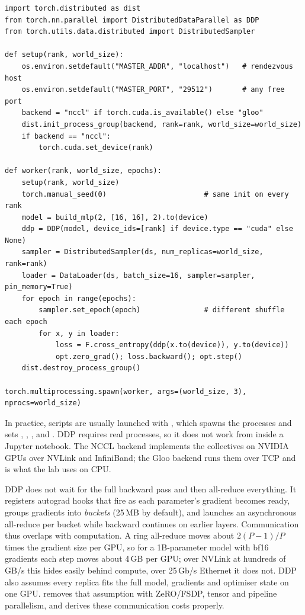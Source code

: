 \begin{lstlisting}[caption={The essential pieces of DDP training (excerpt of \texttt{ddp\_demo.py}).},label={lst:pytorch:ddpcode}]
import torch.distributed as dist
from torch.nn.parallel import DistributedDataParallel as DDP
from torch.utils.data.distributed import DistributedSampler

def setup(rank, world_size):
    os.environ.setdefault("MASTER_ADDR", "localhost")   # rendezvous host
    os.environ.setdefault("MASTER_PORT", "29512")       # any free port
    backend = "nccl" if torch.cuda.is_available() else "gloo"
    dist.init_process_group(backend, rank=rank, world_size=world_size)
    if backend == "nccl":
        torch.cuda.set_device(rank)

def worker(rank, world_size, epochs):
    setup(rank, world_size)
    torch.manual_seed(0)                       # same init on every rank
    model = build_mlp(2, [16, 16], 2).to(device)
    ddp = DDP(model, device_ids=[rank] if device.type == "cuda" else None)
    sampler = DistributedSampler(ds, num_replicas=world_size, rank=rank)
    loader = DataLoader(ds, batch_size=16, sampler=sampler, pin_memory=True)
    for epoch in range(epochs):
        sampler.set_epoch(epoch)               # different shuffle each epoch
        for x, y in loader:
            loss = F.cross_entropy(ddp(x.to(device)), y.to(device))
            opt.zero_grad(); loss.backward(); opt.step()
    dist.destroy_process_group()

torch.multiprocessing.spawn(worker, args=(world_size, 3), nprocs=world_size)
\end{lstlisting}

In practice, scripts are usually launched with , which spawns the
processes and sets , , ,  and . DDP
requires real processes, so it does not work from inside a Jupyter notebook. The NCCL backend implements the
collectives on NVIDIA GPUs over NVLink and InfiniBand; the Gloo backend runs them over TCP and is what the
lab uses on CPU.

\begin{systemslens}
DDP does not wait for the full backward pass and then all-reduce everything. It registers autograd hooks
that fire as each parameter's gradient becomes ready, groups gradients into \emph{buckets} (25\,MB by default),
and launches an asynchronous all-reduce per bucket while backward continues on earlier layers. Communication
thus overlaps with computation. A ring all-reduce moves about $2(P-1)/P$ times the gradient size per GPU, so
for a 1B-parameter model with bf16 gradients each step moves about 4\,GB per GPU; over NVLink at hundreds of
GB/s this hides easily behind compute, over 25\,Gb/s Ethernet it does not. DDP also assumes every replica
fits the full model, gradients and optimiser state on one GPU.  removes that assumption
with ZeRO/FSDP, tensor and pipeline parallelism, and derives these communication costs properly.
\end{systemslens}

